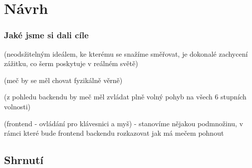 \chapter{Návrh}

\subsection{Jaké jsme si dali cíle}

(neodsžitelným ideálem, ke kterému se snažíme směřovat, je dokonalé zachycení zážitku, co šerm poskytuje v reálném světě)

(meč by se měl chovat fyzikálně věrně)

(z pohledu backendu by meč měl zvládat plně volný pohyb na všech 6 stupních volnosti)

(frontend - ovládání pro klávesnici a myš)
- stanovíme nějakou podmnožinu, v rámci které bude frontend backendu rozkazovat jak má mečem pohnout



\section{Shrnutí}
